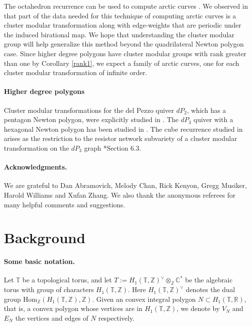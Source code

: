 \documentclass[11pt]{article} %
\theoremstyle{definition}
\newcommand{\Z}{{\mathbb Z}}
\newcommand{\R}{{\mathbb R}}
\newcommand{\C}{{\mathbb C}}
\newcommand{\T}{{\mathbb T}}
\begin{document}
The octahedron recurrence can be used to compute arctic curves \cites{PS06, DFS14}. We observed in \cite{G18} that part of the data needed for this technique of computing arctic curves is a cluster modular transformation along with edge-weights that are periodic under the induced birational map. We hope that understanding the cluster modular group will help generalize this method beyond the quadrilateral Newton polygon case. Since higher degree polygons have cluster modular groups with rank greater than one by Corollary \ref{rank1}, we expect a family of arctic curves, one for each cluster modular transformation of infinite order.

\paragraph{Higher degree polygons}

Cluster modular transformations for the  del Pezzo quiver $dP_2$, which has a pentagon Newton polygon, were explicitly studied in \cite{GLVY16}. The $dP_3$ quiver with a hexagonal Newton polygon has been studied in \cites{LMNT14, LM17, LM19}. The cube recurrence studied in \cites{CS04, PS06} arises as the restriction to the resistor network subvariety of a cluster modular transformation on the $dP_3$ graph \cite{GK12}*{Section 6.3}.

\paragraph{Acknowledgments.} 
We are grateful to Dan Abramovich, Melody Chan, Rick Kenyon, Gregg Musiker, Harold Williams and Xufan Zhang. We also thank the anonymous referees for many helpful comments and suggestions.


\section{Background} 


\paragraph{Some basic notation.}

Let $\T$ be a topological torus, and let $T:=H_1(\T,\Z)^\vee \otimes_\Z \C^*$ be the algebraic torus with group of characters $H_1(\T,\Z)$. Here $H_1(\T,\Z)^\vee$ denotes the dual group $\text{Hom}_\Z(H_1(\T,\Z),\Z)$. Given an convex integral polygon $N \subset H_1(\T,\R)$, that is, a convex polygon whose vertices are in $H_1(\T,\Z) $, we denote by $V_N$ and $E_N$ the vertices and edges of $N$ respectively.
\end{document}
